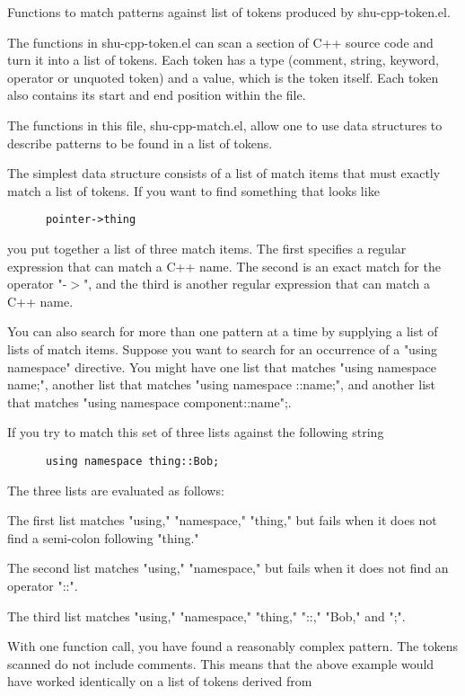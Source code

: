 Functions to match patterns against list of tokens produced by
shu-cpp-token.el.


The functions in shu-cpp-token.el can scan a section of C++ source code and
turn it into a list of tokens.  Each token has a type (comment, string,
keyword, operator or unquoted token) and a value, which is the token itself.
Each token also contains its start and end position within the file.

The functions in this file, shu-cpp-match.el, allow one to use data
structures to describe patterns to be found in a list of tokens.

The simplest data structure consists of a list of match items that must
exactly match a list of tokens.  If you want to find something that looks
like

\small{\begin{verbatim}
      pointer->thing
\end{verbatim}}

you put together a list of three match items.  The first specifies a regular
expression that can match a C++ name.  The second is an exact match for the
operator "-$>$", and the third is another regular expression that can match a
C++ name.

You can also search for more than one pattern at a time by supplying a list
of lists of match items.  Suppose you want to search for an occurrence of a
"using namespace" directive.  You might have one list that matches "using
namespace name;", another list that matches "using namespace ::name;", and
another list that matches "using namespace component::name";.

If you try to match this set of three lists against the following string

\small{\begin{verbatim}
      using namespace thing::Bob;
\end{verbatim}}

The three lists are evaluated as follows:

The first list matches "using," "namespace," "thing," but fails when it does
not find a semi-colon following "thing."

The second list matches "using," "namespace," but fails when it does not find
an operator "::".

The third list matches "using," "namespace," "thing," "::," "Bob," and ";".

With one function call, you have found a reasonably complex pattern.  The
tokens scanned do not include comments.  This means that the above example
would have worked identically on a list of tokens derived from

